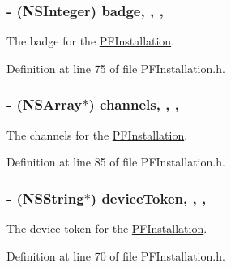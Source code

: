 \subsubsection[{badge}]{\setlength{\rightskip}{0pt plus 5cm}-\/ (N\+S\+Integer) badge\hspace{0.3cm}{\ttfamily [read]}, {\ttfamily [write]}, {\ttfamily [nonatomic]}, {\ttfamily [assign]}}\label{interface_p_f_installation_add31abb42268a9d3f2e744de1316f993}
The badge for the {\ttfamily \hyperlink{interface_p_f_installation}{P\+F\+Installation}}. 

Definition at line 75 of file P\+F\+Installation.\+h.

\hypertarget{interface_p_f_installation_a6cf5a7c40903cdfba2563ec82fadb3f3}{}
\subsubsection[{channels}]{\setlength{\rightskip}{0pt plus 5cm}-\/ (N\+S\+Array$\ast$) channels\hspace{0.3cm}{\ttfamily [read]}, {\ttfamily [write]}, {\ttfamily [nonatomic]}, {\ttfamily [strong]}}\label{interface_p_f_installation_a6cf5a7c40903cdfba2563ec82fadb3f3}
The channels for the {\ttfamily \hyperlink{interface_p_f_installation}{P\+F\+Installation}}. 

Definition at line 85 of file P\+F\+Installation.\+h.

\hypertarget{interface_p_f_installation_a5ea812bfe9db860563f3b672dc657ce7}{}
\subsubsection[{device\+Token}]{\setlength{\rightskip}{0pt plus 5cm}-\/ (N\+S\+String$\ast$) device\+Token\hspace{0.3cm}{\ttfamily [read]}, {\ttfamily [write]}, {\ttfamily [nonatomic]}, {\ttfamily [strong]}}\label{interface_p_f_installation_a5ea812bfe9db860563f3b672dc657ce7}
The device token for the {\ttfamily \hyperlink{interface_p_f_installation}{P\+F\+Installation}}. 

Definition at line 70 of file P\+F\+Installation.\+h.

\hypertarget{interface_p_f_installation_afac8d2521c0fd031e204c5642ce271a6}{}

